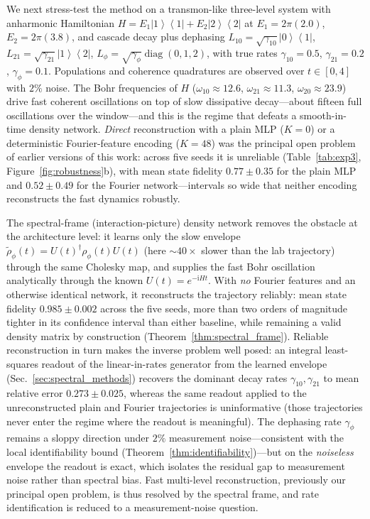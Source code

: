 \documentclass[11pt]{article}
\DeclareMathOperator{\diag}{diag}
\newcommand{\ii}{\mathrm{i}}
\newcommand{\ket}[1]{\left\lvert #1 \right\rangle}
\newcommand{\bra}[1]{\left\langle #1 \right\rvert}
\newcommand{\proj}[1]{\ket{#1}\!\bra{#1}}
\newcommand{\sync}[1]{#1}
\begin{document}
We next stress-test the method on a transmon-like three-level system with anharmonic Hamiltonian $H=E_1\proj{1}+E_2\proj{2}$ at $E_1=2\pi(2.0)$, $E_2=2\pi(3.8)$, and cascade decay plus dephasing $L_{10}=\sqrt{\gamma_{10}}\ket{0}\bra{1}$, $L_{21}=\sqrt{\gamma_{21}}\ket{1}\bra{2}$, $L_\phi=\sqrt{\gamma_\phi}\diag(0,1,2)$, with true rates $\gamma_{10}=0.5$, $\gamma_{21}=0.2$, $\gamma_\phi=0.1$. Populations and coherence quadratures are observed over $t\in[0,4]$ with $2\%$ noise. The Bohr frequencies of $H$ ($\omega_{10}\approx12.6$, $\omega_{21}\approx11.3$, $\omega_{20}\approx23.9$) drive fast coherent oscillations on top of slow dissipative decay---about fifteen full oscillations over the window---and this is the regime that defeats a smooth-in-time density network. \emph{Direct} reconstruction with a plain MLP ($K=0$) or a deterministic Fourier-feature encoding ($K=48$) was the principal open problem of earlier versions of this work: across five seeds it is unreliable (Table~\ref{tab:exp3}, Figure~\ref{fig:robustness}b), with mean state fidelity $\sync{0.77}\pm\sync{0.35}$ for the plain MLP and $\sync{0.52}\pm\sync{0.49}$ for the Fourier network---intervals so wide that neither encoding reconstructs the fast dynamics robustly.

The spectral-frame (interaction-picture) density network removes the obstacle at the architecture level: it learns only the slow envelope $\widetilde\rho_\phi(t)=U(t)^\dagger\rho_\phi(t)U(t)$ (here $\sim40\times$ slower than the lab trajectory) through the same Cholesky map, and supplies the fast Bohr oscillation analytically through the known $U(t)=e^{-\ii Ht}$. With \emph{no} Fourier features and an otherwise identical network, it reconstructs the trajectory reliably: mean state fidelity $\sync{0.985}\pm\sync{0.002}$ across the five seeds, more than two orders of magnitude tighter in its confidence interval than either baseline, while remaining a valid density matrix by construction (Theorem~\ref{thm:spectral_frame}). Reliable reconstruction in turn makes the inverse problem well posed: an integral least-squares readout of the linear-in-rates generator from the learned envelope (Sec.~\ref{sec:spectral_methods}) recovers the dominant decay rates $\gamma_{10},\gamma_{21}$ to mean relative error $\sync{0.273}\pm\sync{0.025}$, whereas the same readout applied to the unreconstructed plain and Fourier trajectories is uninformative (those trajectories never enter the regime where the readout is meaningful). The dephasing rate $\gamma_\phi$ remains a sloppy direction under $2\%$ measurement noise---consistent with the local identifiability bound (Theorem~\ref{thm:identifiability})---but on the \emph{noiseless} envelope the readout is exact, which isolates the residual gap to measurement noise rather than spectral bias. Fast multi-level reconstruction, previously our principal open problem, is thus resolved by the spectral frame, and rate identification is reduced to a measurement-noise question.
\end{document}
